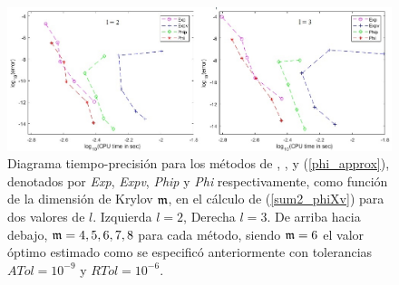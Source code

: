 \begin{figure}[ht]
	\includegraphics[scale=0.55]{Graphics/phil2l3.jpg}
	\caption{Diagrama tiempo-precisión para los métodos de \cite{hochbruck1997krylov}, \cite{sidje1998expokit}, \cite{niesen2012algorithm} y (\ref{phi_approx}), denotados por \textit{Exp}, \textit{Expv}, \textit{Phip} y \textit{Phi} respectivamente, como función de la dimensión de Krylov $\mathfrak{m}$, en el cálculo de  (\ref{sum2_phiXv}) para dos valores de $l$. Izquierda $l=2$, Derecha $l=3$. De arriba hacia debajo, $\mathfrak{m}=4,5,6,7,8$ para cada método, siendo $\mathfrak{m}=6$ el valor óptimo estimado como se especificó anteriormente con tolerancias $ATol=10^{-9}$ y $RTol=10^{-6}$.}
	\label{fig:SumPhi}
\end{figure}

